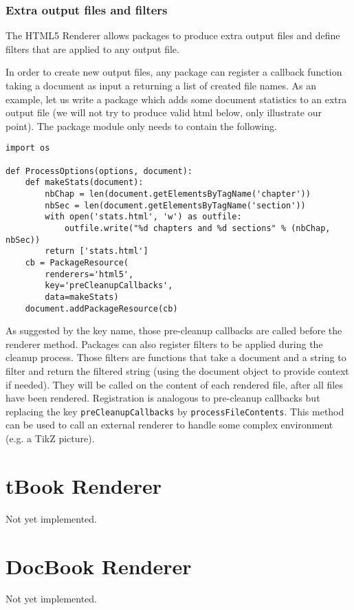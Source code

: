 \subsubsection*{Extra output files and filters}

The HTML5 Renderer allows packages to produce extra output files and
define filters that are applied to any output file. 

In order to create new output files, any package can register a callback
function taking a document as input a returning a list of created file
names. As an example, let us write a package which adds some document
statistics to an extra output file  (we will not try to
produce valid html below, only illustrate our point). The package module
only needs to contain the following.
\begin{verbatim}
import os

def ProcessOptions(options, document):
    def makeStats(document):
        nbChap = len(document.getElementsByTagName('chapter'))
        nbSec = len(document.getElementsByTagName('section'))
        with open('stats.html', 'w') as outfile:
            outfile.write("%d chapters and %d sections" % (nbChap, nbSec))
        return ['stats.html']
    cb = PackageResource(
        renderers='html5',
        key='preCleanupCallbacks',
        data=makeStats)
    document.addPackageResource(cb)
\end{verbatim}

As suggested by the key name, those pre-cleanup callbacks are called before
the renderer  method. Packages can also register filters to be
applied during the cleanup process. Those filters are functions that take a
document and a string to filter and return the filtered string (using the
document object to provide context if needed). They will be called on the
content of each rendered file, after all files have been rendered.
Registration is analogous to pre-cleanup callbacks but replacing the key
\verb+preCleanupCallbacks+ by \verb+processFileContents+. This method can be
used to call an external renderer to handle some complex environment (e.g. a
TikZ picture).


\section{tBook Renderer}

Not yet implemented.

\section{DocBook Renderer}

Not yet implemented.
